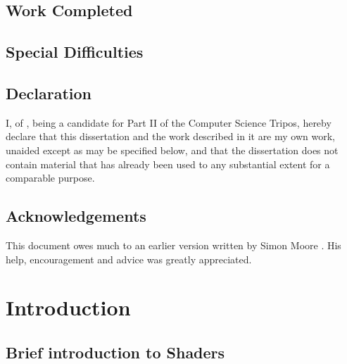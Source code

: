\documentclass[12pt,twoside,notitlepage]{report}
\begin{document}
\section*{Work Completed}


\section*{Special Difficulties}

 
\newpage
\section*{Declaration}

I, \name of \college, being a candidate for Part II of the Computer
Science Tripos, hereby declare
that this dissertation and the work described in it are my own work,
unaided except as may be specified below, and that the dissertation
does not contain material that has already been used to any substantial
extent for a comparable purpose.

\bigskip
{}

\medskip
{}

\cleardoublepage

\tableofcontents

\listoffigures

\newpage
\section*{Acknowledgements}

This document owes much to an earlier version written by Simon Moore
\cite{moore95}.  His help, encouragement and advice was greatly 
appreciated.


\cleardoublepage        %

\setcounter{page}{1}
\pagestyle{headings}

\chapter{Introduction}

\section{Brief introduction to Shaders}
\end{document}
